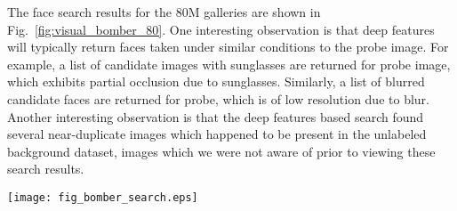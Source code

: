 \documentclass[10pt,journal,compsoc]{IEEEtran}
\begin{document}
The face search results for the $80$M galleries are shown in Fig.~\ref{fig:visual_bomber_80}. One interesting observation is that deep features will typically return faces taken under similar conditions to the probe image. For example, a list of candidate images with sunglasses are returned for probe image, which exhibits partial occlusion due to sunglasses. Similarly, a list of blurred candidate faces are returned for probe, which is of low resolution due to blur. Another interesting observation is that the deep features based search found several near-duplicate images which happened to be present in the unlabeled background dataset, images which we were not aware of prior to viewing these search results.

\newcommand{\includeBomberVisual}[1]{\texttt{[image: \#1]}}
\begin{figure*}[htbp]
    \centering
    \texttt{[image: fig\_bomber\_search.eps]}\vspace{-0.1in}
    \caption{Top $10$ search results for the two Boston marathon bombers on the $80$M face gallery. The first two probe faces  are of the older brother (Dzhokhar Tsarnaev) and the last three probe faces are of the younger brother (Tamerlan Tsarnaev). For each probe face, the retrieved image with \textcolor{green}{green} border is the correctly retrieved image. Images with the \textcolor{red}{red} border are near-duplicate images present in the gallery. Note that we were not aware of the existence of these near-duplicate images in the gallery before the search.} \label{fig:visual_bomber_80}
\end{figure*}
\end{document}
